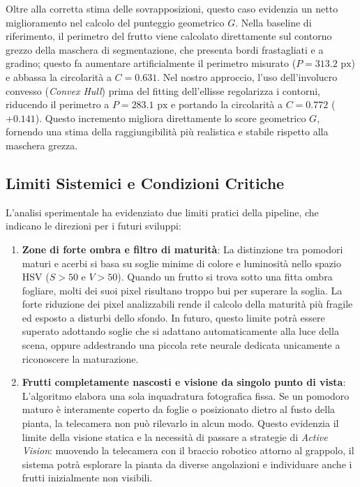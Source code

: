 Oltre alla corretta stima delle sovrapposizioni, questo caso evidenzia un netto 
miglioramento nel calcolo del punteggio geometrico $G$. Nella baseline di 
riferimento, il perimetro del frutto viene calcolato direttamente sul contorno 
grezzo della maschera di segmentazione, che presenta bordi frastagliati e a 
gradino; questo fa aumentare artificialmente il perimetro misurato 
($P = 313.2\text{ px}$) e abbassa la circolarità a $C = 0.631$. Nel nostro 
approccio, l'uso dell'involucro convesso (\textit{Convex Hull}) prima del fitting 
dell'ellisse regolarizza i contorni, riducendo il perimetro a $P = 283.1\text{ px}$ 
e portando la circolarità a $C = 0.772$ ($+0.141$). Questo incremento 
migliora direttamente lo score geometrico $G$, fornendo una stima della 
raggiungibilità più realistica e stabile rispetto alla maschera grezza.


\subsection{Limiti Sistemici e Condizioni Critiche}
\label{subsec:limiti_sistemici}

L'analisi sperimentale ha evidenziato due limiti pratici della pipeline, 
che indicano le direzioni per i futuri sviluppi:
\begin{enumerate}
    \item \textbf{Zone di forte ombra e filtro di maturità}: La distinzione tra 
    pomodori maturi e acerbi si basa su soglie minime di colore e luminosità 
    nello spazio HSV ($S > 50$ e $V > 50$). Quando un frutto si trova sotto una 
    fitta ombra fogliare, molti dei suoi pixel risultano troppo bui per 
    superare la soglia. La forte riduzione dei pixel analizzabili rende il 
    calcolo della maturità più fragile ed esposto a disturbi dello sfondo. In 
    futuro, questo limite potrà essere superato adottando soglie che si adattano 
    automaticamente alla luce della scena, oppure addestrando una piccola rete 
    neurale dedicata unicamente a riconoscere la maturazione.
    \item \textbf{Frutti completamente nascosti e visione da singolo punto 
    di vista}: L'algoritmo elabora una sola inquadratura fotografica fissa. 
    Se un pomodoro maturo è interamente coperto da foglie o posizionato dietro 
    al fusto della pianta, la telecamera non può rilevarlo in alcun modo. 
    Questo evidenzia il limite della visione statica e la necessità di passare 
    a strategie di \textit{Active Vision}: muovendo la telecamera con il braccio 
    robotico attorno al grappolo, il sistema potrà esplorare la pianta da diverse 
    angolazioni e individuare anche i frutti inizialmente non visibili.
\end{enumerate}
